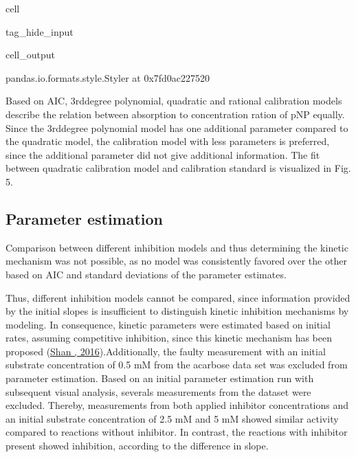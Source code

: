 \documentclass[letterpaper,12pt,english]{jupyterBook}
\begin{document}
\begin{sphinxuseclass}{cell}
\begin{sphinxuseclass}{tag_hide_input}
\begin{sphinxVerbatimOutput}
\begin{sphinxuseclass}{cell_output}
\begin{sphinxVerbatim}[commandchars=\\\{\}]
\PYGZlt{}pandas.io.formats.style.Styler at 0x7fd0ac227520\PYGZgt{}
\end{sphinxVerbatim}

\noindent{}

\end{sphinxuseclass}\end{sphinxVerbatimOutput}

\end{sphinxuseclass}
\end{sphinxuseclass}
\sphinxAtStartPar
{}

\sphinxAtStartPar
Based on AIC, 3rd\sphinxhyphen{}degree polynomial, quadratic and rational calibration models describe the relation between absorption to concentration ration of p\sphinxhyphen{}NP equally. Since the 3rd\sphinxhyphen{}degree polynomial model has one additional parameter compared to the quadratic model, the calibration model with less parameters is preferred, since the additional parameter did not give additional information. The fit between quadratic calibration model and calibration standard is visualized in Fig. 5.


\subsection{Parameter estimation}
\label{\detokenize{scenarios/glycosidase_inhibition:parameter-estimation}}
\sphinxAtStartPar
Comparison between different inhibition models and thus determining the kinetic mechanism was not possible, as no model was consistently favored over the other based on AIC and standard deviations of the parameter estimates.

\sphinxAtStartPar
Thus, different inhibition models cannot be compared, since information provided by the initial slopes is insufficient to distinguish kinetic inhibition mechanisms by modeling. In consequence, kinetic parameters were estimated based on initial rates, assuming competitive inhibition, since this kinetic mechanism has been proposed (\hyperlink{cite.references:id26}{Shan , 2016}).Additionally, the faulty measurement with an initial substrate concentration of 0.5 mM from the acarbose data set was excluded from parameter estimation.
Based on an initial parameter estimation run with subsequent visual analysis, severals measurements from the  dataset were excluded. Thereby, measurements from both applied inhibitor concentrations and an initial substrate concentration of 2.5 mM and 5 mM showed similar activity compared to reactions without inhibitor. In contrast, the reactions with inhibitor present showed inhibition, according to the difference in slope.
\end{document}

